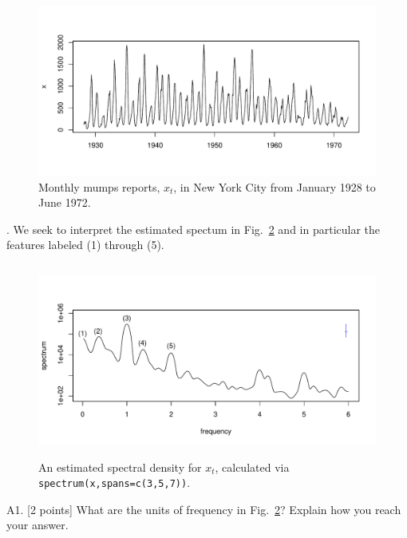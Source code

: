 \documentclass[11pt]{article}
\def\bc{\begin{center}}
\def\ec{\end{center}}
\begin{document}
\begin{figure}[h]
\bc
\vspace{-1cm}
\includegraphics[width=6in]{mumps}
\vspace{-1.8cm}
\ec
\caption{Monthly mumps reports, $x_t$, in New York City from January 1928 to June 1972.}\label{fig:data}
\end{figure}



. We seek to interpret the estimated spectum in Fig.~\ref{fig:spec} and in particular the features labeled (1) through (5).


\begin{figure}[h]
\bc\vspace{-1cm}
\includegraphics[width=6in,height=2.5in]{mumps-spec}
\ec\vspace{-1cm}
\caption{An estimated spectral density for $x_t$, calculated via \texttt{spectrum(x,spans=c(3,5,7))}.}\label{fig:spec}
\end{figure}

A1. [2 points] What are the units of frequency in Fig.~\ref{fig:spec}? Explain how you reach your answer.
\end{document}
